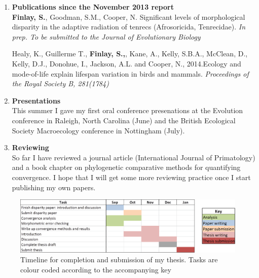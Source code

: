 \documentclass[12pt,a4paper]{article}
\begin{document}
	\begin{enumerate}

	\item \textbf{Publications since the November 2013 report}\\
		\textbf{Finlay, S.}, Goodman, S.M., Cooper, N. Significant levels of morphological disparity in the adaptive radiation of tenrecs (Afrosoricida, Tenrecidae). \textit{In prep. To be submitted to the Journal of Evolutionary Biology}\\
	
	\bigskip 
	
		Healy, K., Guillerme T., \textbf{Finlay, S.,}, Kane, A., Kelly, S.B.A., McClean, D., Kelly, D.J., Donohue, I., Jackson, A.L. and Cooper, N., 2014.Ecology and mode-of-life explain lifespan variation in birds and mammals. \textit{Proceedings of the Royal Society B, 281(1784)} 

	\item \textbf{Presentations}\\
		This summer I gave my first oral conference presenations at the Evolution conference in Raleigh, North Carolina (June) and the British Ecological Society Macroecology conference in Nottingham (July). 

	\item \textbf{Reviewing}\\

		So far I have reviewed a journal article (International Journal of Primatology) and a book chapter on phylogenetic comparative methods for quantifying convergence. I hope that I will get some more reviewing practice once I start publishing my own papers.

	\end{enumerate}

\begin{landscape}
  \begin{figure}[p]
	\centering
	\includegraphics[keepaspectratio=true]{Gannt_July.png}
	\caption{Timeline for completion and submission of my thesis. Tasks are colour coded according to the accompanying key}
	\label{gantt}
  \end{figure}
\end{landscape}



 
\end{document}
